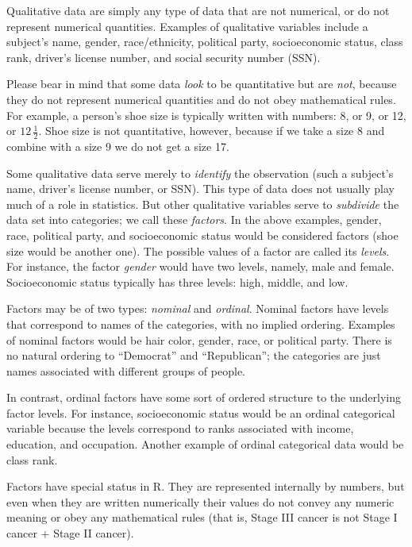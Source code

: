 \documentclass[captions=tableheading]{scrbook}
\begin{document}
\label{sub:Qualitative-Data}

Qualitative data are simply any type of data that are not numerical, or do not represent numerical quantities. Examples of qualitative variables include a subject's name, gender, race/ethnicity, political party, socioeconomic status, class rank, driver's license number, and social security number (SSN).

Please bear in mind that some data \emph{look} to be quantitative but are \emph{not}, because they do not represent numerical quantities and do not obey mathematical rules. For example, a person's shoe size is typically written with numbers: 8, or 9, or 12, or \(12\,\frac{1}{2}\). Shoe size is not quantitative, however, because if we take a size 8 and combine with a size 9 we do not get a size 17.

Some qualitative data serve merely to \emph{identify} the observation (such a subject's name, driver's license number, or SSN). This type of data does not usually play much of a role in statistics. But other qualitative variables serve to \emph{subdivide} the data set into categories; we call these \emph{factors}. In the above examples, gender, race, political party, and socioeconomic status would be considered factors (shoe size would be another one). The possible values of a factor are called its \emph{levels}. For instance, the factor \emph{gender} would have two levels, namely, male and female. Socioeconomic status typically has three levels: high, middle, and low.

Factors may be of two types: \emph{nominal} and \emph{ordinal}. Nominal factors have levels that correspond to names of the categories, with no implied ordering. Examples of nominal factors would be hair color, gender, race, or political party. There is no natural ordering to ``Democrat'' and ``Republican''; the categories are just names associated with different groups of people. 

In contrast, ordinal factors have some sort of ordered structure to the underlying factor levels. For instance, socioeconomic status would be an ordinal categorical variable because the levels correspond to ranks associated with income, education, and occupation. Another example of ordinal categorical data would be class rank.

Factors have special status in \textsf{R}. They are represented internally by numbers, but even when they are written numerically their values do not convey any numeric meaning or obey any mathematical rules (that is, Stage III cancer is not Stage I cancer + Stage II cancer).
\end{document}
